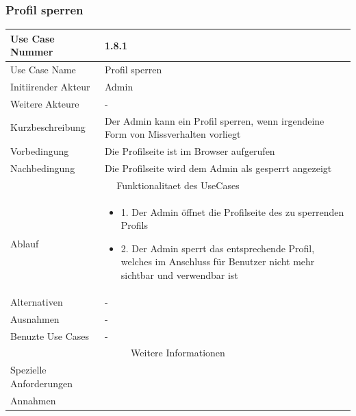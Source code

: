 \documentclass[10pt,a4paper]{article}
\begin{document}
			\subsubsection{Profil sperren}
		\begin{tabular}{|l|p{.5\linewidth}|}
		\hline Use Case Nummer & 1.8.1 \\ 
		\hline Use Case Name & Profil sperren \\ 
		\hline Initiirender Akteur & Admin \\
		\hline Weitere Akteure & - \\
		\hline Kurzbeschreibung & Der Admin kann ein Profil sperren, wenn irgendeine Form von Missverhalten vorliegt \\
		\hline Vorbedingung & Die Profilseite ist im Browser aufgerufen \\
		\hline Nachbedingung & Die Profilseite wird dem Admin als gesperrt angezeigt \\
		\hline \multicolumn{2}{|c|}{Funktionalitaet des UseCases}\\
		\hline Ablauf & \begin{itemize}
					\item 1. Der Admin \"offnet die Profilseite des zu sperrenden Profils
					\item 2. Der Admin sperrt das entsprechende Profil, welches im Anschluss f\"ur Benutzer nicht mehr sichtbar und verwendbar ist
				\end{itemize}\\
		\hline Alternativen & - \\
		\hline Ausnahmen & - \\
		\hline Benuzte Use Cases & - \\
		\hline \multicolumn{2}{|c|}{Weitere Informationen} \\
		\hline Spezielle Anforderungen &  \\
		\hline Annahmen &  \\
		\hline
		\end{tabular}
		
\end{document}
